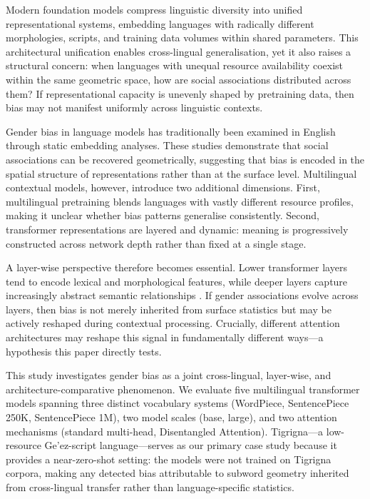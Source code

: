 \documentclass[10pt]{article}
\begin{document}
Modern foundation models compress linguistic diversity into unified
representational systems, embedding languages with radically different
morphologies, scripts, and training data volumes within shared parameters.
This architectural unification enables cross-lingual generalisation, yet it
also raises a structural concern: when languages with unequal resource
availability coexist within the same geometric space, how are social
associations distributed across them? If representational capacity is
unevenly shaped by pretraining data, then bias may not manifest uniformly
across linguistic contexts.

Gender bias in language models has traditionally been examined in English
through static embedding analyses. These studies demonstrate that social
associations can be recovered geometrically, suggesting that bias is encoded
in the spatial structure of representations rather than at the surface level.
Multilingual contextual models, however, introduce two additional dimensions.
First, multilingual pretraining blends languages with vastly different resource
profiles, making it unclear whether bias patterns generalise consistently.
Second, transformer representations are layered and dynamic: meaning is
progressively constructed across network depth rather than fixed at a single
stage.

A layer-wise perspective therefore becomes essential. Lower transformer layers
tend to encode lexical and morphological features, while deeper layers capture
increasingly abstract semantic relationships \citep{rogers2020primer,
tenney-etal-2019-bert}. If gender associations evolve across layers, then bias
is not merely inherited from surface statistics but may be actively reshaped
during contextual processing. Crucially, different attention architectures may
reshape this signal in fundamentally different ways---a hypothesis this paper
directly tests.

This study investigates gender bias as a joint cross-lingual, layer-wise, and
architecture-comparative phenomenon. We evaluate five multilingual transformer
models spanning three distinct vocabulary systems (WordPiece, SentencePiece
250K, SentencePiece 1M), two model scales (base, large), and two attention
mechanisms (standard multi-head, Disentangled Attention). Tigrigna---a
low-resource Ge'ez-script language---serves as our primary case study because
it provides a near-zero-shot setting: the models were not trained on Tigrigna
corpora, making any detected bias attributable to subword geometry inherited
from cross-lingual transfer rather than language-specific statistics.
\end{document}
